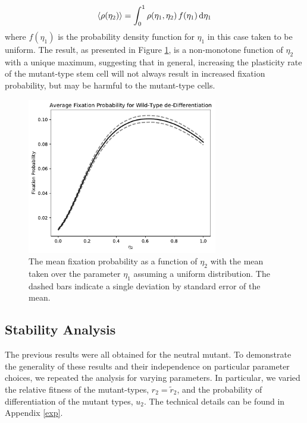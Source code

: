 \documentclass[12pt]{article}
\renewcommand{\d}{{\rm d}}
\begin{document}
\[\langle\rho(\eta_2)\rangle = \int_0^1 \rho(\eta_1, \eta_2)\,f(\eta_1)\,\d \eta_1\]
where $f(\eta_1)$ is the probability density function for $\eta_1$ in this case taken to be uniform. The result, as presented in Figure \ref{avg_eta1_plot}, is a non-monotone function of $\eta_2$ with a unique maximum, suggesting that in general, increasing the plasticity rate of the mutant-type stem cell will not always result in increased fixation probability, but may be harmful to the mutant-type cells.

\begin{figure}[H]
\begin{center}
\includegraphics[width=0.74\textwidth]{avg_eta1_plot.pdf}
\end{center}
\caption{The mean fixation probability as a function of $\eta_2$ with the mean taken over the parameter $\eta_1$ assuming a uniform distribution. The dashed bars indicate a single deviation by standard error of the mean.}\label{avg_eta1_plot}
\end{figure}

\subsection{Stability Analysis}\label{stab}

The previous results were all obtained for the neutral mutant. To demonstrate the generality of these results and their independence on particular parameter choices, we repeated the analysis for varying parameters. In particular, we varied the relative fitness of the mutant-types, $r_2=\tilde{r}_2$, and the probability of differentiation of the mutant types, $u_2$. The technical details can be found in Appendix \ref{exp}.
\end{document}
